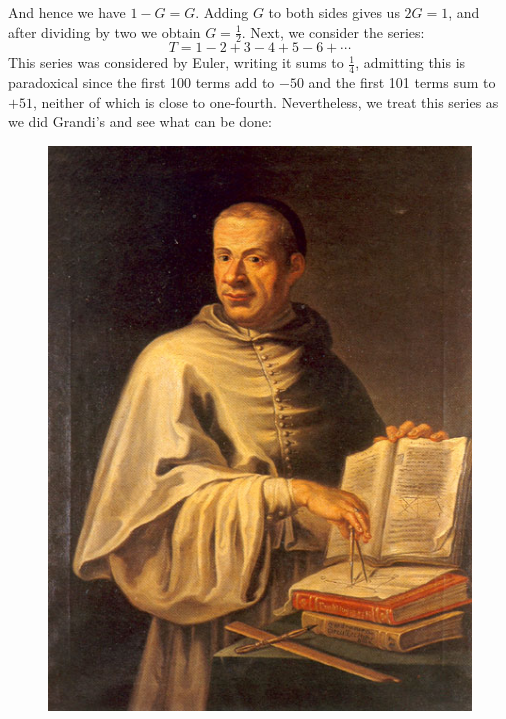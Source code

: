 \begin{example}
\begin{table}[H]
\begin{tabular}{rrrrrrrrrrrrr}
$$                    &$\Big]$\\[1ex]
                \hline\\
                    &$=$&$1$&$-$&$1$&$+$&$1$&$-$&$1$&$+$&$\cdots$\\[1ex]
                \hline\\
                &$=$&$G$
            \end{tabular}
            \caption{Grandi's Series $1-1+1-1+\cdots$}
        \end{table}
        \begin{minipage}[c]{0.58\textwidth}
            And hence we have $1-G=G$. Adding $G$ to both sides gives us $2G=1$,
            and after dividing by two we obtain $G=\frac{1}{2}$.
            Next, we consider the series:
            \begin{equation}
                T=1-2+3-4+5-6+\cdots
            \end{equation}
            This series was considered by Euler, writing it sums to
            $\frac{1}{4}$, admitting this is paradoxical since the first
            100 terms add to $\minus{50}$ and the first 101 terms sum to $+51$,
            neither of which is close to one-fourth. Nevertheless, we treat this
            series as we did Grandi's and see what can be done:
        \end{minipage}
        \hfill
        \begin{minipage}[c]{0.4\textwidth}
            \centering
            \begin{figure}[H]
                \centering
                \captionsetup{type=figure}
                \if{}
                    \includegraphics{photos/GuidoGrandi.jpg}

\end{figure}
\end{minipage}
\end{example}
